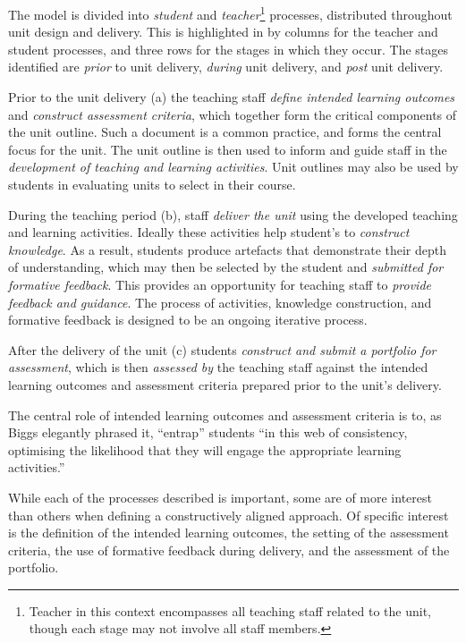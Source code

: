 The model is divided into \emph{student} and \emph{teacher}\footnote{Teacher in this context encompasses all teaching staff related to the unit, though each stage may not involve all staff members.} processes, distributed throughout unit design and delivery. This is highlighted in  by columns for the teacher and student processes, and three rows for the stages in which they occur. The stages identified are \emph{prior} to unit delivery, \emph{during} unit delivery, and \emph{post} unit delivery.

Prior to the unit delivery (a) the teaching staff \emph{define intended learning outcomes} and \emph{construct assessment criteria}, which together form the critical components of the unit outline. Such a document is a common practice, and forms the central focus for the unit. The unit outline is then used to inform and guide staff in the \emph{development of teaching and learning activities}. Unit outlines may also be used by students in evaluating units to select in their course.

During the teaching period (b), staff \emph{deliver the unit} using the developed teaching and learning activities. Ideally these activities help student's to \emph{construct knowledge}. As a result, students produce artefacts that demonstrate their depth of understanding, which may then be selected by the student and \emph{submitted for formative feedback}. This provides an opportunity for teaching staff to \emph{provide feedback and guidance}. The process of activities, knowledge construction, and formative feedback is designed to be an ongoing iterative process.

After the delivery of the unit (c) students \emph{construct and submit a portfolio for assessment}, which is then \emph{assessed by} the teaching staff against the intended learning outcomes and assessment criteria prepared prior to the unit's delivery.

The central role of intended learning outcomes and assessment criteria is to, as Biggs elegantly phrased it, ``entrap'' students ``in this web of consistency, optimising the likelihood that they will engage the appropriate learning activities.''~\cite{Biggs:1999}

While each of the processes described is important, some are of more interest than others when defining a constructively aligned approach. Of specific interest is the definition of the intended learning outcomes, the setting of the assessment criteria, the use of formative feedback during delivery, and the assessment of the portfolio.

